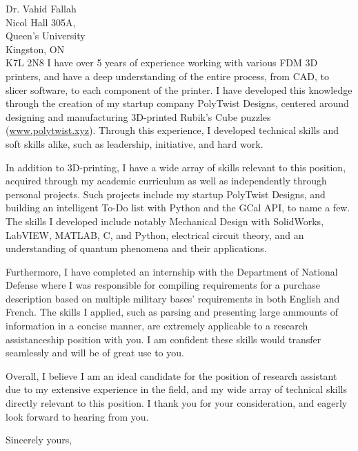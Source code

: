 \documentclass[11pt]{letter} %
\begin{document}
\begin{letter}{Dr. Vahid Fallah \\
Nicol Hall 305A, \\
Queen's University \\
Kingston, ON \\
K7L 2N8}
I have over 5 years of experience working with various FDM 3D printers, and have a deep understanding of the entire process, from CAD, to slicer software, to each component of the printer. I have developed this knowledge through the creation of my startup company PolyTwist Designs, centered around designing and manufacturing 3D-printed Rubik's Cube puzzles (\url{www.polytwist.xyz}). Through this experience, I developed technical skills and soft skills alike, such as leadership, initiative, and hard work.

In addition to 3D-printing, I have a wide array of skills relevant to this position, acquired through my academic curriculum as well as independently through personal projects. Such projects include my startup PolyTwist Designs, and building an intelligent To-Do list with Python and the GCal API, to name a few. The skills I developed include notably Mechanical Design with SolidWorks, LabVIEW, MATLAB, C, and Python, electrical circuit theory, and an understanding of quantum phenomena and their applications.

Furthermore, I have completed an internship with the Department of National Defense where I was responsible for compiling requirements for a purchase description based on multiple military bases' requirements in both English and French. The skills I applied, such as parsing and presenting large ammounts of information in a concise manner, are extremely applicable to a research assistanceship position with you. I am confident these skills would transfer seamlessly and will be of great use to you.

Overall, I believe I am an ideal candidate for the position of research assistant due to my extensive experience in the field, and my wide array of technical skills directly relevant to this position. I thank you for your consideration, and eagerly look forward to hearing from you.

\closing{Sincerely yours,}


\end{letter}
\end{document}
